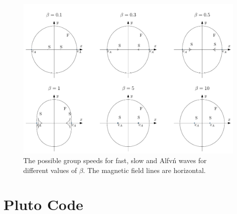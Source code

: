 \documentclass[a4paper]{article}
\numberwithin{figure}{section}
\numberwithin{equation}{section}
\begin{document}
\begin{figure}[h]
	\centering
	\includegraphics[width =\textwidth]{figures/groupspeed_beta.pdf}
	\caption{The possible group speeds for fast, slow and Alfv\'n waves for different values of $\beta$. The magnetic field lines are horizontal.}
	\label{fig:groupspeed_beta}
\end{figure}

\pagebreak

\section{Pluto Code} \label{sec:pluto_code}
\end{document}

